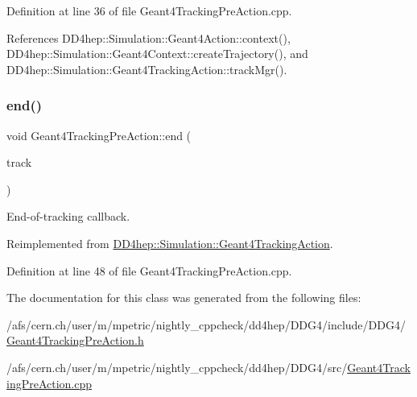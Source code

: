 Definition at line 36 of file Geant4\+Tracking\+Pre\+Action.\+cpp.



References D\+D4hep\+::\+Simulation\+::\+Geant4\+Action\+::context(), D\+D4hep\+::\+Simulation\+::\+Geant4\+Context\+::create\+Trajectory(), and D\+D4hep\+::\+Simulation\+::\+Geant4\+Tracking\+Action\+::track\+Mgr().

\hypertarget{class_d_d4hep_1_1_simulation_1_1_geant4_tracking_pre_action_a372b3efd2f2ac8f2c75bb435fd286ac3}{}\label{class_d_d4hep_1_1_simulation_1_1_geant4_tracking_pre_action_a372b3efd2f2ac8f2c75bb435fd286ac3} 
\subsubsection{\texorpdfstring{end()}{end()}}
{\footnotesize\ttfamily void Geant4\+Tracking\+Pre\+Action\+::end (\begin{DoxyParamCaption}\item[{const G4\+Track $\ast$}]{track }\end{DoxyParamCaption})\hspace{0.3cm}{\ttfamily [virtual]}}



End-\/of-\/tracking callback. 



Reimplemented from \hyperlink{class_d_d4hep_1_1_simulation_1_1_geant4_tracking_action_a29f980c180576781771ea325b4a73f14}{D\+D4hep\+::\+Simulation\+::\+Geant4\+Tracking\+Action}.



Definition at line 48 of file Geant4\+Tracking\+Pre\+Action.\+cpp.



The documentation for this class was generated from the following files\+:\begin{DoxyCompactItemize}
\item 
/afs/cern.\+ch/user/m/mpetric/nightly\+\_\+cppcheck/dd4hep/\+D\+D\+G4/include/\+D\+D\+G4/\hyperlink{_geant4_tracking_pre_action_8h}{Geant4\+Tracking\+Pre\+Action.\+h}\item 
/afs/cern.\+ch/user/m/mpetric/nightly\+\_\+cppcheck/dd4hep/\+D\+D\+G4/src/\hyperlink{_geant4_tracking_pre_action_8cpp}{Geant4\+Tracking\+Pre\+Action.\+cpp}\end{DoxyCompactItemize}
